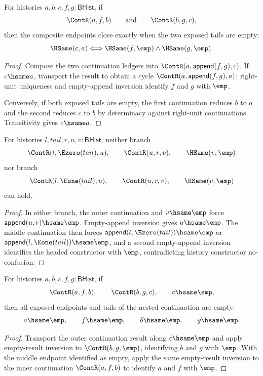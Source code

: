 \begin{theorem}
\label{thm:cont-composite-endpoint-empty-tails-iff}
For histories $a,b,c,f,g:\mathsf{BHist}$, if
$$
\ContR(a,f,b)\qquad\text{and}\qquad \ContR(b,g,c),
$$
then the composite endpoints close exactly when the two exposed tails are empty:
$$
\HSame(c,a)\Longleftrightarrow \HSame(f,\emp)\land\HSame(g,\emp).
$$
\end{theorem}
\begin{proof}
Compose the two continuation ledgers into
$\ContR(a,\mathsf{append}(f,g),c)$. If $c\hsame a$, transport the result to
obtain a cycle $\ContR(a,\mathsf{append}(f,g),a)$; right-unit uniqueness and
empty-append inversion identify $f$ and $g$ with $\emp$.

Conversely, if both exposed tails are empty, the first continuation reduces
$b$ to $a$ and the second reduces $c$ to $b$ by determinacy against right-unit
continuations. Transitivity gives $c\hsame a$.
\end{proof}

\begin{theorem}
\label{thm:cont-nested-visible-middle-result-absurd}
For histories $l,tail,r,u,v:\mathsf{BHist}$, neither branch
$$
\ContR(l,\Ezero(tail),u),\qquad \ContR(u,r,v),\qquad \HSame(v,\emp)
$$
nor branch
$$
\ContR(l,\Eone(tail),u),\qquad \ContR(u,r,v),\qquad \HSame(v,\emp)
$$
can hold.
\end{theorem}
\begin{proof}
In either branch, the outer continuation and $v\hsame\emp$ force
$\mathsf{append}(u,r)\hsame\emp$. Empty-append inversion gives $u\hsame\emp$.
The middle continuation then forces
$\mathsf{append}(l,\Ezero(tail))\hsame\emp$ or
$\mathsf{append}(l,\Eone(tail))\hsame\emp$, and a second empty-append
inversion identifies the headed constructor with $\emp$, contradicting
history constructor no-confusion.
\end{proof}

\begin{theorem}
\label{thm:cont-nested-empty-result-inversion}
For histories $a,b,c,f,g:\mathsf{BHist}$, if
$$
\ContR(a,f,b),\qquad \ContR(b,g,c),\qquad c\hsame\emp,
$$
then all exposed endpoints and tails of the nested continuation are empty:
$$
a\hsame\emp,\qquad f\hsame\emp,\qquad b\hsame\emp,\qquad g\hsame\emp .
$$
\end{theorem}
\begin{proof}
Transport the outer continuation result along $c\hsame\emp$ and apply
empty-result inversion to $\ContR(b,g,\emp)$, identifying $b$ and $g$ with
$\emp$. With the middle endpoint identified as empty, apply the same
empty-result inversion to the inner continuation $\ContR(a,f,b)$ to identify
$a$ and $f$ with $\emp$.
\end{proof}

